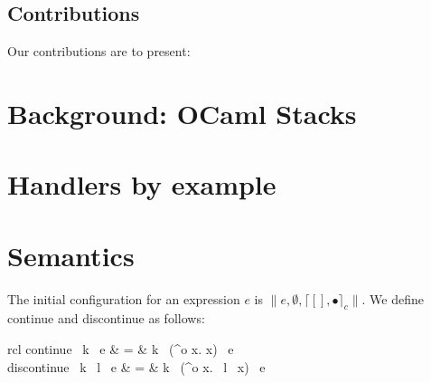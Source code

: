 \documentclass[sigplan,10pt,review,anonymous]{acmart}\settopmatter{printfolios=true,printccs=false,printacmref=false}
\newenvironment{nop}{}{}
\newenvironment{smathpar}{
\begin{nop}\small\begin{mathpar}}{
\end{mathpar}\end{nop}\ignorespacesafterend}
\newcommand{\olam}[2]{\lambda^o #1. #2}
\newcommand{\kw}[1]{\text{\bf #1}}
\newcommand{\throw}[2]{\kw{raise} ~#1 ~#2}
\newcommand{\cstacka}[2]{\big \lceil #1, #2 \big \rceil_c} %
\newcommand{\configa}[3]{\|#1,#2,#3\|}
\begin{document}
\subsection{Contributions}

Our contributions are to present:


\section{Background: OCaml Stacks}

\section{Handlers by example}

\section{Semantics}

The initial configuration for an expression $e$ is
$\configa{e}{\emptyset}{\cstacka{[]}{\bullet}}$. We define {\sf continue} and
{\sf discontinue} as follows:

\begin{smathpar}
	\begin{array}{rcl}
		\textsf{continue} ~k ~e & = & k ~(\olam{x}{x}) ~e \\
		\textsf{discontinue} ~k ~l ~e & = & k ~(\olam{x}{\throw{l}{x}}) ~e
	\end{array}
\end{smathpar}
\end{document}
